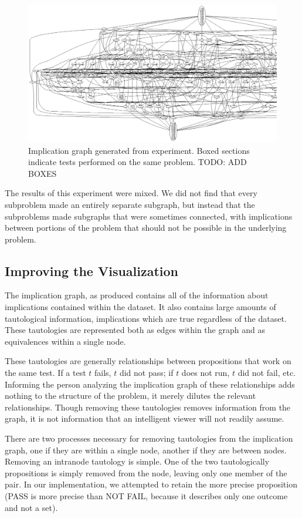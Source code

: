 \documentclass[11pt]{article}
\begin{document}
\begin{figure}
\includegraphics[scale=0.5]{div.ps}
\caption{Implication graph generated from experiment. Boxed sections indicate tests performed on the same problem. TODO: ADD BOXES}
\end{figure}

The results of this experiment were mixed. We did not find that every subproblem made an entirely separate subgraph, but instead that the subproblems made subgraphs that were sometimes connected, with implications between portions of the problem that should not be possible in the underlying problem.

\subsection{Improving the Visualization}
The implication graph, as produced contains all of the information about implications contained within the dataset. It also contains large amounts of tautological information, implications which are true regardless of the dataset. These tautologies are represented both as edges within the graph and as equivalences within a single node.

These tautologies are generally relationships between propositions that work on the same test. If a test $t$ fails, $t$ did not pass; if $t$ does not run, $t$ did not fail, etc. Informing the person analyzing the implication graph of these relationships adds nothing to the structure of the problem, it merely dilutes the relevant relationships. Though removing these tautologies removes information from the graph, it is not information that an intelligent viewer will not readily assume.

There are two processes necessary for removing tautologies from the implication graph, one if they are within a single node, another if they are between nodes. Removing an intranode tautology is simple. One of the two tautologically propositions is simply removed from the node, leaving only one member of the pair. In our implementation, we attempted to retain the more precise proposition (PASS is more precise than NOT FAIL, because it describes only one outcome and not a set). 
\end{document}
